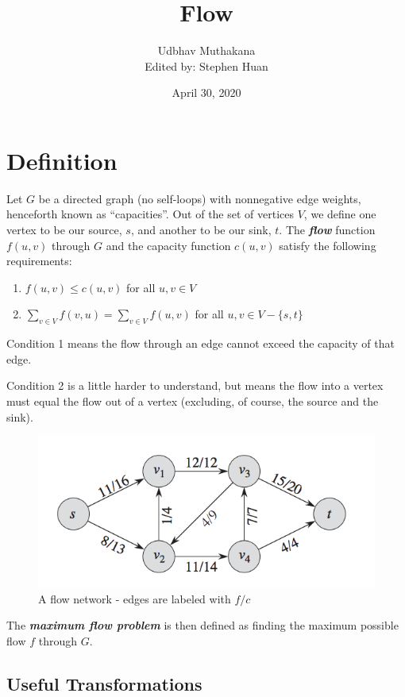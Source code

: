 \documentclass[11pt, oneside]{article}
\title{Flow}
\author{Udbhav Muthakana \\ Edited by: Stephen Huan}
\date{April 30, 2020}
\newcommand{\smallemphasis}[1]{\textbf{\textit{#1}}}
\begin{document}
\maketitle

\section{Definition}
Let \( G \) be a directed graph (no self-loops) with nonnegative edge weights, henceforth known as ``capacities''. Out of the set of vertices \( V \), we define one vertex to be our source, \( s \), and another to be our sink, \( t \). The \smallemphasis{flow} function \(f(u, v) \) through \( G \) and the capacity function \( c(u, v) \) satisfy the following requirements:

\begin{enumerate}
   \item \( f(u, v) \leq c(u, v) \) for all \( u, v \in V \)
   \item \( \sum_{v \in V} f(v, u) = \sum_{v \in V} f(u, v) \) for all \( u, v \in V - \{s, t\} \)
\end{enumerate}

Condition 1 means the flow through an edge cannot exceed the capacity of that edge.

Condition 2 is a little harder to understand, but means the flow into a vertex must equal the flow out of a vertex (excluding, of course, the source and the sink).

\begin{figure}[h!]
\centering
\includegraphics[scale=1]{flowdiagram}
\caption{A flow network - edges are labeled with \( f/c \)}
\end{figure}

The \smallemphasis{maximum flow problem} is then defined as finding the maximum possible flow \( f \) through \( G \).

\newpage
\subsection{Useful Transformations}
\end{document}
